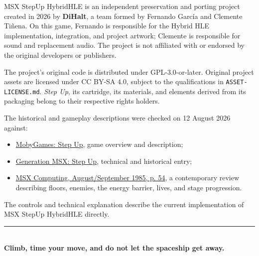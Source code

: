 \documentclass[11pt,a4paper]{article}
\begin{document}
MSX StepUp HybridHLE is an independent preservation and porting project
created in 2026 by \textbf{DiHalt}, a team formed by Fernando García and
Clemente Tiñena. On this game, Fernando is responsible for the Hybrid HLE
implementation, integration, and project artwork; Clemente is responsible for
sound and replacement audio. The project is not affiliated with or endorsed
by the original developers or publishers.

The project's original code is distributed under GPL-3.0-or-later. Original
project assets are licensed under CC BY-SA 4.0, subject to the qualifications
in \texttt{ASSET-LICENSE.md}. \textit{Step Up}, its cartridge, its materials,
and elements derived from its packaging belong to their respective rights
holders.

The historical and gameplay descriptions were checked on 12 August 2026
against:

\begin{itemize}
  \item \href{https://www.mobygames.com/game/19749/step-up/}%
        {MobyGames: Step Up}, game overview and description;
  \item \href{https://www.generation-msx.nl/software/takara-marvel-soft/step-up/42/}%
        {Generation MSX: Step Up}, technical and historical entry;
  \item \href{https://files.techinfo.newmsx.nl/Magazines/EN/MSX\%20Computing/MSX\%20Computing\%201985-08.pdf}%
        {MSX Computing, August/September 1985, p. 54}, a contemporary review
        describing floors, enemies, the energy barrier, lives, and stage
        progression.
\end{itemize}

The controls and technical explanation describe the current implementation of
MSX StepUp HybridHLE directly.

\vfill
\begin{center}
\textcolor{msxblue}{\rule{0.65\textwidth}{0.6pt}}\\[5pt]
\textbf{Climb, time your move, and do not let the spaceship get away.}
\end{center}
\end{document}
